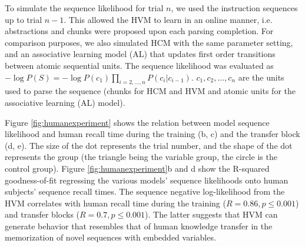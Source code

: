 \documentclass{article} %
\theoremstyle{remark}
\begin{document}
To simulate the sequence likelihood for trial $n$, we used the instruction sequences up to trial $n-1$. This allowed the HVM to learn in an online manner, i.e. abstractions and chunks were proposed upon each parsing completion. For comparison purposes, we also simulated HCM with the same parameter setting, and an associative learning model (AL) that updates first order transitions between atomic sequential units. 
The sequence likelihood was evaluated as $-\log P(S) = -\log P(c_1) \prod_{i = 2, ..., n} P(c_i|c_{i-1})$. $c_1, c_2, ..., c_n$ are the units used to parse the sequence (chunks for HCM and HVM and atomic units for the associative learning (AL) model).  

Figure \ref{fig:humanexperiment} shows the relation between model sequence likelihood and human recall time during the training (b, c) and the transfer block (d, e). The size of the dot represents the trial number, and the shape of the dot represents the group (the triangle being the variable group, the circle is the control group). Figure \ref{fig:humanexperiment}b and d show the R-squared goodness-of-fit regressing the various models' sequence likelihoods onto human subjects' sequence recall times. 
The sequence negative log-likelihood from the HVM correlates with human recall time during the training ($R = 0.86, p \leq 0.001$) and transfer blocks ($R = 0.7, p \leq 0.001$). The latter suggests that HVM can generate behavior that resembles that of human knowledge transfer in the memorization of novel sequences with embedded variables. 




\end{document}
